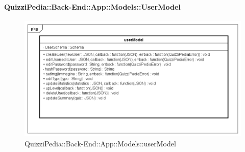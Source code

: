\paragraph{QuizziPedia::Back-End::App::Models::UserModel}
\label{QuizziPedia::Back-End::App::Models::userModel}
\begin{figure}
	\centering
	\includegraphics[scale=0.45]{UML/Package/QuizziPedia_Back-End_App_Models_userModel.png}
	\caption{QuizziPedia::Back-End::App::Models::userModel}
\end{figure}
